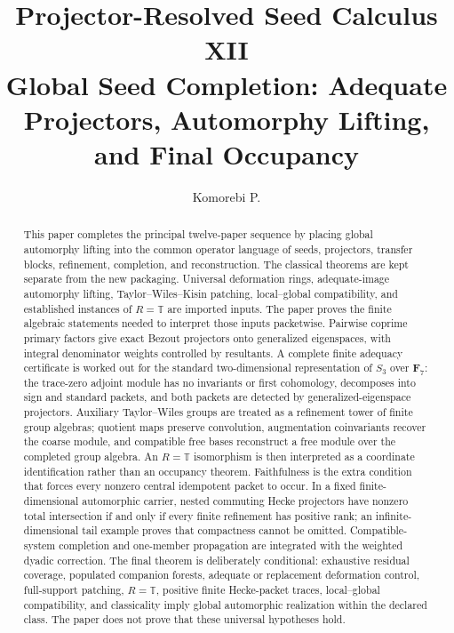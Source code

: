 \documentclass[11pt]{article}
\title{\textbf{Projector-Resolved Seed Calculus XII}\\[0.35em]
\large Global Seed Completion: Adequate Projectors, Automorphy Lifting, and Final Occupancy}
\author{Komorebi P.}
\date{}
\theoremstyle{definition}
\theoremstyle{remark}
\newcommand{\F}{\mathbf F}
\newcommand{\T}{\mathbb T}
\begin{document}
\maketitle

\begin{abstract}
This paper completes the principal twelve-paper sequence by placing global automorphy lifting into the common operator language of seeds, projectors, transfer blocks, refinement, completion, and reconstruction.  The classical theorems are kept separate from the new packaging.  Universal deformation rings, adequate-image automorphy lifting, Taylor--Wiles--Kisin patching, local--global compatibility, and established instances of $R=\T$ are imported inputs.  The paper proves the finite algebraic statements needed to interpret those inputs packetwise.  Pairwise coprime primary factors give exact Bezout projectors onto generalized eigenspaces, with integral denominator weights controlled by resultants.  A complete finite adequacy certificate is worked out for the standard two-dimensional representation of $S_3$ over $\F_7$: the trace-zero adjoint module has no invariants or first cohomology, decomposes into sign and standard packets, and both packets are detected by generalized-eigenspace projectors.  Auxiliary Taylor--Wiles groups are treated as a refinement tower of finite group algebras; quotient maps preserve convolution, augmentation coinvariants recover the coarse module, and compatible free bases reconstruct a free module over the completed group algebra.  An $R=\T$ isomorphism is then interpreted as a coordinate identification rather than an occupancy theorem.  Faithfulness is the extra condition that forces every nonzero central idempotent packet to occur.  In a fixed finite-dimensional automorphic carrier, nested commuting Hecke projectors have nonzero total intersection if and only if every finite refinement has positive rank; an infinite-dimensional tail example proves that compactness cannot be omitted.  Compatible-system completion and one-member propagation are integrated with the weighted dyadic correction.  The final theorem is deliberately conditional: exhaustive residual coverage, populated companion forests, adequate or replacement deformation control, full-support patching, $R=\T$, positive finite Hecke-packet traces, local--global compatibility, and classicality imply global automorphic realization within the declared class.  The paper does not prove that these universal hypotheses hold.
\end{abstract}
\end{document}
